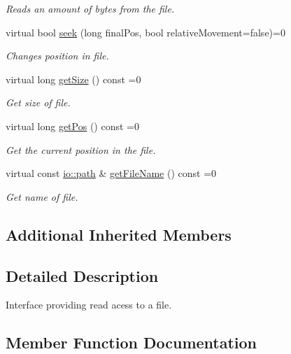 \begin{DoxyCompactItemize}
\begin{DoxyCompactList}\small\item\em Reads an amount of bytes from the file. \end{DoxyCompactList}\item 
virtual bool \hyperlink{classirr_1_1io_1_1IReadFile_ac1cd81f18832e8703838d7abd495bf34}{seek} (long final\+Pos, bool relative\+Movement=false)=0
\begin{DoxyCompactList}\small\item\em Changes position in file. \end{DoxyCompactList}\item 
virtual long \hyperlink{classirr_1_1io_1_1IReadFile_a9c64fca7f1d665d7e458cd7d766c35a2}{get\+Size} () const =0
\begin{DoxyCompactList}\small\item\em Get size of file. \end{DoxyCompactList}\item 
virtual long \hyperlink{classirr_1_1io_1_1IReadFile_aeee143ee38871c30f240c025b100941d}{get\+Pos} () const =0
\begin{DoxyCompactList}\small\item\em Get the current position in the file. \end{DoxyCompactList}\item 
virtual const \hyperlink{namespaceirr_1_1io_a6468281622ce3a1c46b72e19f32dded5}{io\+::path} \& \hyperlink{classirr_1_1io_1_1IReadFile_a73b9c884319d2e4b0ff9a7ea15cbf316}{get\+File\+Name} () const =0
\begin{DoxyCompactList}\small\item\em Get name of file. \end{DoxyCompactList}\end{DoxyCompactItemize}
\subsection*{Additional Inherited Members}


\subsection{Detailed Description}
Interface providing read acess to a file. 

\subsection{Member Function Documentation}
\mbox{\label{classirr_1_1io_1_1IReadFile_a73b9c884319d2e4b0ff9a7ea15cbf316}} 
